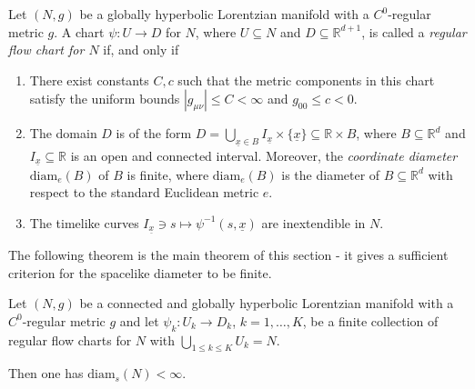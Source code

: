 \documentclass[reqno]{article}
\newcommand{\R}{\mathbb{R}}
\newcommand{\diam}{\mathrm{diam}}
\newcommand{\ux}{\underline{x}}
\begin{document}
\begin{definition}\label{schwdef:DefRegFlowChart}
\label{DefRegFlowChart}
Let $(N,g)$ be a globally hyperbolic Lorentzian manifold with a $C^0$-regular metric $g$. A chart $\psi : U \to D$ for $N$, where $U \subseteq N$ and $D \subseteq \R^{d+1}$, is called a \emph{regular flow chart for $N$} if, and only if
\begin{enumerate}
\item There exist constants $C, c$ such that the metric components in this chart satisfy the uniform bounds $|g_{\mu \nu} | \leq C < \infty$ and $g_{00} \leq c < 0$.
\item The domain $D$ is of the form $D = \bigcup_{ \ux \in B} I_{\ux} \times \{\ux\} \subseteq \R \times B$, where $B \subseteq \R^d$ and $I_{\ux} \subseteq \R$ is an open and connected interval. Moreover, the \emph{coordinate diameter} $\diam_e(B)$ of $B$ is finite, where $\diam_e(B)$ is the diameter of $B \subseteq \R^d$ with respect to the standard Euclidean metric $e$.
\item The timelike curves $I_{\ux} \ni s \mapsto \psi^{-1}(s, \ux)$ are inextendible in $N$.
\end{enumerate}
\end{definition}

The following theorem is the main theorem of this section - it gives a sufficient criterion for the spacelike diameter to be finite.

\begin{theorem}\label{schwthm:DiamFinite}
\label{DiamFinite}
Let $(N,g)$ be a connected and globally hyperbolic Lorentzian manifold with a $C^0$-regular metric $g$ and let $\psi_k : U_k \to D_k$, $k = 1, \ldots, K$, be a finite collection of regular flow charts for $N$ with $\bigcup_{1 \leq k \leq K} U_k = N$.

Then one has $\diam_s(N) < \infty$.
\end{theorem}
\end{document}
